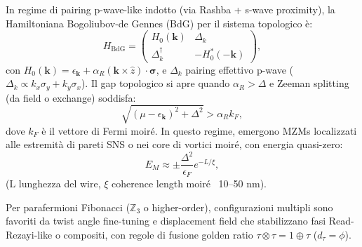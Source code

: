\documentclass[11pt,a4paper]{article}
\theoremstyle{plain}
\theoremstyle{definition}
\begin{document}
In regime di pairing p-wave-like indotto (via Rashba + s-wave proximity), la Hamiltoniana Bogoliubov-de Gennes (BdG) per il sistema topologico è:
\begin{equation}
H_{\text{BdG}} = \begin{pmatrix}
H_0(\mathbf{k}) & \Delta_k \\
\Delta_k^\dagger & -H_0^*(-\mathbf{k})
\end{pmatrix},
\end{equation}
con $H_0(\mathbf{k}) = \epsilon_{\mathbf{k}} + \alpha_R (\mathbf{k} \times \hat{z}) \cdot \boldsymbol{\sigma}$, e $\Delta_k$ pairing effettivo p-wave ($\Delta_k \propto k_x \sigma_y + k_y \sigma_x$). Il gap topologico si apre quando $\alpha_R > \Delta$ e Zeeman splitting (da field o exchange) soddisfa:
\begin{equation}
\sqrt{(\mu - \epsilon_{\mathbf{k}})^2 + \Delta^2} > \alpha_R k_F,
\end{equation}
dove $k_F$ è il vettore di Fermi moiré. In questo regime, emergono MZMs localizzati alle estremità di pareti SNS o nei core di vortici moiré, con energia quasi-zero:
\begin{equation}
E_M \approx \pm \frac{\Delta^2}{\epsilon_F} e^{-L/\xi},
\end{equation}
(L lunghezza del wire, $\xi$ coherence length moiré ~10–50 nm).

Per parafermioni Fibonacci ($\mathbb{Z}_3$ o higher-order), configurazioni multipli sono favoriti da twist angle fine-tuning e displacement field che stabilizzano fasi Read-Rezayi-like o compositi, con regole di fusione golden ratio $\tau \otimes \tau = 1 \oplus \tau$ ($d_\tau = \phi$).
\end{document}

